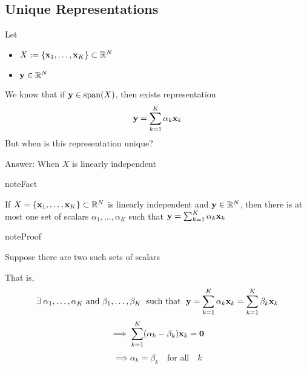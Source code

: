 \documentclass[letterpaper,10pt,english]{jupyterBook}
\begin{document}
\subsection{Unique Representations}
\label{\detokenize{05.linear_algebra:unique-representations}}
\sphinxAtStartPar
Let
\begin{itemize}
\item {} 
\sphinxAtStartPar
\(X := \{{\bf x}_1,\ldots,{\bf x}_K\} \subset \mathbb{R}^N\)

\item {} 
\sphinxAtStartPar
\({\bf y} \in \mathbb{R}^N\)

\end{itemize}

\sphinxAtStartPar
We know that if \({\bf y} \in \mathrm{span}(X)\), then exists representation
\begin{equation*}
\begin{split}
%
{\bf y} = \sum_{k=1}^K \alpha_k {\bf x}_k
%
\end{split}
\end{equation*}
\sphinxAtStartPar
But when is this representation unique?

\sphinxAtStartPar
Answer: When \(X\) is linearly independent

\begin{sphinxadmonition}{note}{Fact}

\sphinxAtStartPar
If \(X = \{{\bf x}_1,\ldots, {\bf x}_K\} \subset \mathbb{R}^N\) is linearly independent and
\({\bf y} \in \mathbb{R}^N\), then there is at most one set of scalars \(\alpha_1,\ldots,\alpha_K\) such
that \({\bf y} = \sum_{k=1}^K \alpha_k {\bf x}_k\)
\end{sphinxadmonition}

\begin{sphinxadmonition}{note}{Proof}

\sphinxAtStartPar
Suppose there are two such sets of scalars

\sphinxAtStartPar
That is,
\begin{equation*}
\begin{split}
%
\exists \;
\alpha_1, \ldots, \alpha_K
\text{ and } \beta_1, \ldots, \beta_K
\; \text{ such that } \; 
{\bf y} 
= \sum_{k=1}^K \alpha_k {\bf x}_k
= \sum_{k=1}^K \beta_k {\bf x}_k
%
\end{split}
\end{equation*}\begin{equation*}
\begin{split}
%
\implies \sum_{k=1}^K (\alpha_k - \beta_k) {\bf x}_k = {\bf 0}
%
\end{split}
\end{equation*}\begin{equation*}
\begin{split}
%
\implies
\alpha_k = \beta_k 
\quad \text{for all} \quad k
%
\end{split}
\end{equation*}\end{sphinxadmonition}
\end{document}
